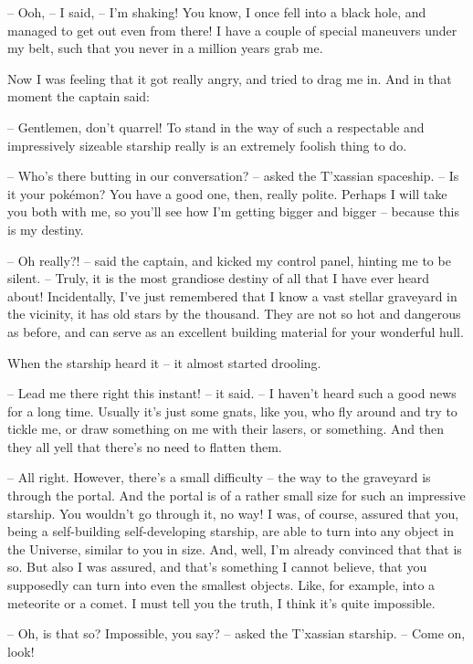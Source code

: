 \documentclass[ebook,twoside,final,openright]{memoir}
\begin{document}
– Ooh, – I said, – I’m shaking! You know, I once fell into a black hole, and managed to get out even from there! I have a couple of special maneuvers under my belt, such that you never in a million years grab me.\par
\par
Now I was feeling that it got really angry, and tried to drag me in. And in that moment the captain said:\par
– Gentlemen, don’t quarrel! To stand in the way of such a respectable and impressively sizeable starship really is an extremely foolish thing to do.\par
– Who’s there butting in our conversation? – asked the T'xassian spaceship. – Is it your pokémon? You have a good one, then, really polite. Perhaps I will take you both with me, so you’ll see how I’m getting bigger and bigger – because this is my destiny.\par
– Oh really?! – said the captain, and kicked my control panel, hinting me to be silent. – Truly, it is the most grandiose destiny of all that I have ever heard about! Incidentally, I’ve just remembered that I know a vast stellar graveyard in the vicinity, it has old stars by the thousand. They are not so hot and dangerous as before, and can serve as an excellent building material for your wonderful hull.\par
When the starship heard it – it almost started drooling.\par
– Lead me there right this instant! – it said. – I haven’t heard such a good news for a long time. Usually it’s just some gnats, like you, who fly around and try to tickle me, or draw something on me with their lasers, or something. And then they all yell that there’s no need to flatten them.\par
– All right. However, there’s a small difficulty – the way to the graveyard is through the portal. And the portal is of a rather small size for such an impressive starship. You wouldn’t go through it, no way! I was, of course, assured that you, being a self-building self-developing starship, are able to turn into any object in the Universe, similar to you in size. And, well, I’m already convinced that that is so. But also I was assured, and that’s something I cannot believe, that you supposedly can turn into even the smallest objects. Like, for example, into a meteorite or a comet. I must tell you the truth, I think it’s quite impossible.\par
– Oh, is that so? Impossible, you say? – asked the T'xassian starship. – Come on, look!\par
\end{document}

